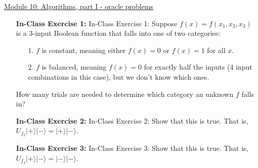 \documentclass[main.tex]{subfiles}
\begin{document}
\href{https://www2.seas.gwu.edu/~simhaweb/quantum/modules/module10/module10.html}{Module 10: Algorithms, part I - oracle problems}

\begin{enumerate}

\item[] \textbf{In-Class Exercise 1:} In-Class Exercise 1: Suppose $f(x)=f\left(x_{1}, x_{2}, x_{3}\right)$ is a 3-input Boolean function that falls into one of two categories:
\begin{enumerate}
    \item [1.] $f$ is constant, meaning either $f(x)=0$ or $f(x)=1$ for all $x$.
    \item [2.] $f$ is balanced, meaning $f(x)=0$ for exactly half the inputs (4 input combinations in this case), but we don't know which ones. 
\end{enumerate}
How many trials are needed to determine which category an unknown $f$ falls in?

\item[] \textbf{In-Class Exercise 2:} In-Class Exercise 2: Show that this is true. That is, $U_{f_{2}}|+\rangle|-\rangle=|+\rangle|-\rangle$.

\item[] \textbf{In-Class Exercise 3:} In-Class Exercise 3: Show that this is true. That is, $U_{f_{4}}|+\rangle|-\rangle=|-\rangle|-\rangle$.

\end{enumerate}
\end{document}
